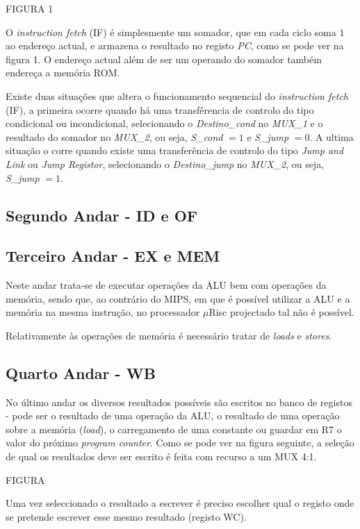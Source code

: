 \documentclass[11pt]{article}
\numberwithin{equation}{section}
\begin{document}
FIGURA 1

O \textit{instruction fetch} (IF) é simplesmente um somador, que em cada ciclo soma $1$ ao endereço actual, e armazena o resultado no registo  \textit{PC}, como se pode ver na figura 1. O endereço actual além de ser um operando do somador também endereça a memória ROM.

Existe duas situações que altera o funcionamento sequencial do \textit{instruction fetch} (IF), a primeira ocorre quando há uma transfêrencia de controlo do tipo condicional ou incondicional, selecionando o \textit{Destino\_cond} no \textit{MUX\_1} e o resultado do somador no \textit{MUX\_2}, ou seja, \textit{S\_cond} $=1$ e \textit{S\_jump} $=0$. A ultima situação o corre quando existe uma transferência de controlo do tipo \textit{Jump and Link} ou \textit{Jump Registor}, selecionando o \textit{Destino\_jump} no \textit{MUX\_2}, ou seja, \textit{S\_jump} $=1$.


\subsection{Segundo Andar - ID e OF}
\subsection{Terceiro Andar - EX e MEM}

Neste andar trata-se de executar operações da ALU bem com operações da memória, sendo que, ao contrário do MIPS, em que é possível utilizar a ALU e a memória na mesma instrução, no processador $\mu$Risc projectado tal não é possível.


Relativamente às operações de memória é necessário tratar de \textit{loads} e \textit{stores}.

\subsection{Quarto Andar - WB}

No último andar os diversos resultados possíveis são escritos no banco de registos - pode ser o resultado de uma operação da ALU, o resultado de uma operação sobre a memória (\textit{load}), o carregamento de uma constante ou guardar em R7 o valor do próximo \textit{program counter}. Como se pode ver na figura seguinte, a seleção de qual os resultados deve ser escrito é feita com recurso a um MUX 4:1. 

FIGURA

Uma vez seleccionado o resultado a escrever é preciso escolher qual o registo onde se pretende escrever esse mesmo resultado (registo WC). 
\end{document}
